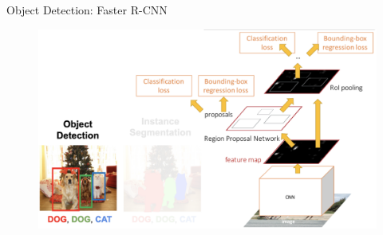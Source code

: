 \documentclass[10pt]{beamer}
\theoremstyle{remark}
\theoremstyle{definition}
\begin{document}
\begin{frame}{Object Detection: Faster R-CNN}
\begin{figure}
\centering
\includegraphics[width=1.0\textwidth,height=1.0\textheight,keepaspectratio]{./images/ins_5.png}
\end{figure}
    
\end{frame}
\end{document}
